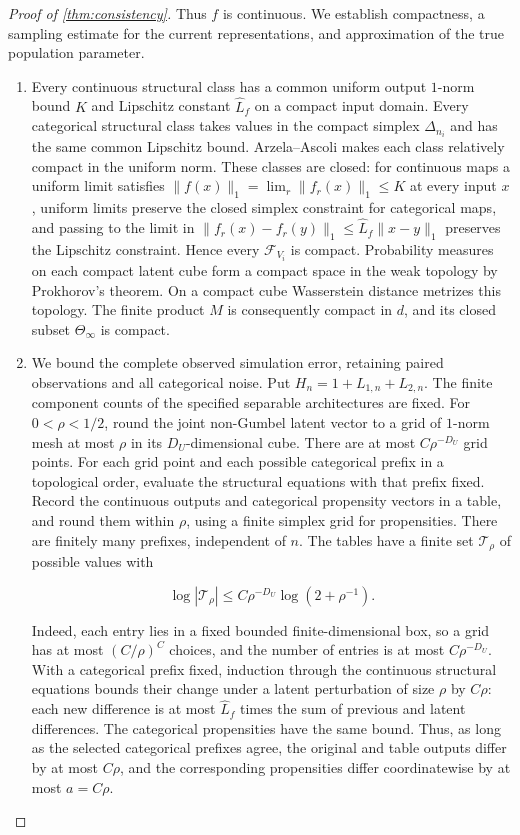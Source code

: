 \begin{proof}[Proof of \cref{thm:consistency}]
Thus $f$ is continuous.
We establish compactness, a sampling estimate for the current representations, and approximation of the true population parameter.
\begin{enumerate}
    \item Every continuous structural class has a common uniform output $1$-norm bound $K$ and Lipschitz constant $\hat L_f$ on a compact input domain. Every categorical structural class takes values in the compact simplex $\Delta_{n_i}$ and has the same common Lipschitz bound. Arzela--Ascoli makes each class relatively compact in the uniform norm. These classes are closed: for continuous maps a uniform limit satisfies $\|f(x)\|_1=\lim_r\|f_r(x)\|_1\leqslant K$ at every input $x$, uniform limits preserve the closed simplex constraint for categorical maps, and passing to the limit in $\|f_r(x)-f_r(y)\|_1\leqslant\hat L_f\|x-y\|_1$ preserves the Lipschitz constraint. Hence every $\mathcal F_{V_i}$ is compact. Probability measures on each compact latent cube form a compact space in the weak topology by Prokhorov's theorem. On a compact cube Wasserstein distance metrizes this topology. The finite product $M$ is consequently compact in $d$, and its closed subset $\Theta_\infty$ is compact.
    \item We bound the complete observed simulation error, retaining paired observations and all categorical noise. Put $H_n=1+L_{1,n}+L_{2,n}$. The finite component counts of the specified separable architectures are fixed. For $0<\rho<1/2$, round the joint non-Gumbel latent vector to a grid of $1$-norm mesh at most $\rho$ in its $D_U$-dimensional cube. There are at most $C\rho^{-D_U}$ grid points. For each grid point and each possible categorical prefix in a topological order, evaluate the structural equations with that prefix fixed. Record the continuous outputs and categorical propensity vectors in a table, and round them within $\rho$, using a finite simplex grid for propensities. There are finitely many prefixes, independent of $n$. The tables have a finite set $\mathcal T_\rho$ of possible values with

\[
\log|\mathcal T_\rho|\leqslant C\rho^{-D_U}\log(2+\rho^{-1}).
\]

Indeed, each entry lies in a fixed bounded finite-dimensional box, so a grid has at most $(C/\rho)^C$ choices, and the number of entries is at most $C\rho^{-D_U}$. With a categorical prefix fixed, induction through the continuous structural equations bounds their change under a latent perturbation of size $\rho$ by $C\rho$: each new difference is at most $\hat L_f$ times the sum of previous and latent differences. The categorical propensities have the same bound. Thus, as long as the selected categorical prefixes agree, the original and table outputs differ by at most $C\rho$, and the corresponding propensities differ coordinatewise by at most $a=C\rho$. 


\end{enumerate}
\end{proof}
